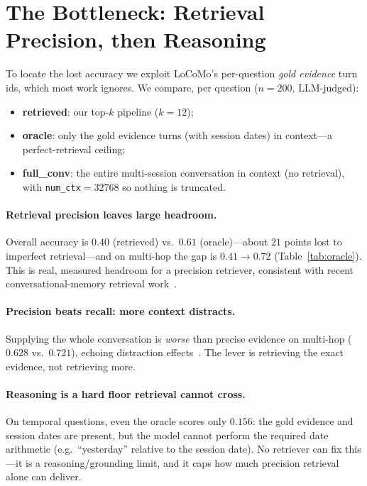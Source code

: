 \section{The Bottleneck: Retrieval Precision, then Reasoning}
\label{sec:bottleneck}

To locate the lost accuracy we exploit LoCoMo's per-question \emph{gold
evidence} turn ids, which most work ignores. We compare, per question
($n{=}200$, LLM-judged):
\begin{itemize}
  \item \textbf{retrieved}: our top-$k$ pipeline ($k{=}12$);
  \item \textbf{oracle}: only the gold evidence turns (with session dates) in
  context---a perfect-retrieval ceiling;
  \item \textbf{full\_conv}: the entire multi-session conversation in context
  (no retrieval), with \texttt{num\_ctx}$=32768$ so nothing is truncated.
\end{itemize}

\paragraph{Retrieval precision leaves large headroom.}
Overall accuracy is $0.40$ (retrieved) vs.\ $0.61$ (oracle)---about $21$ points
lost to imperfect retrieval---and on multi-hop the gap is $0.41\!\to\!0.72$
(Table~\ref{tab:oracle}). This is real, measured headroom for a precision
retriever, consistent with recent conversational-memory retrieval
work~\cite{li2026evimem,ji2026mragent}.

\paragraph{Precision beats recall: more context distracts.}
Supplying the whole conversation is \emph{worse} than precise evidence on
multi-hop ($0.628$ vs.\ $0.721$), echoing distraction
effects~\cite{liu2023lost,cuconasu2024power}. The lever is retrieving the exact
evidence, not retrieving more.

\paragraph{Reasoning is a hard floor retrieval cannot cross.}
On temporal questions, even the oracle scores only $0.156$: the gold evidence
and session dates are present, but the model cannot perform the required date
arithmetic (e.g.\ ``yesterday'' relative to the session date). No retriever can
fix this---it is a reasoning/grounding limit, and it caps how much precision
retrieval alone can deliver.

